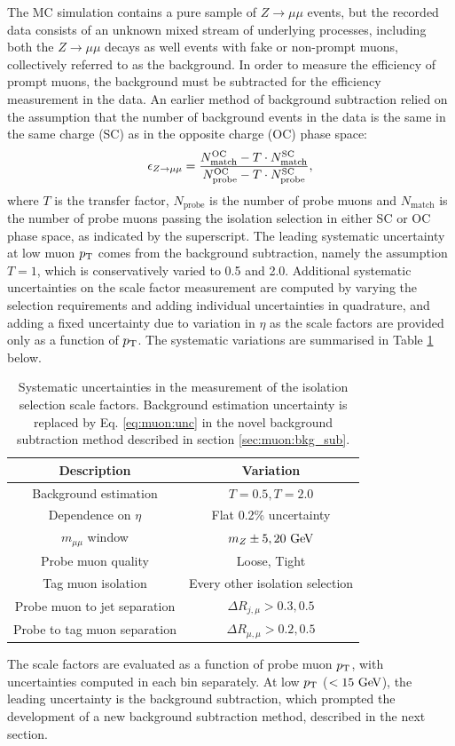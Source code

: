 The MC simulation contains a pure sample of $Z\rightarrow\mu\mu$ events,
but the recorded data consists of an unknown mixed stream of underlying
processes, including both the $Z\rightarrow\mu\mu$ decays as well events with fake
or non-prompt muons, collectively referred to as the background. In order
to measure the efficiency of prompt muons, the background must be
subtracted for the efficiency measurement in the data. An earlier method of
background subtraction relied on the assumption that the number of
background events in the data is the same in the same charge
(SC) as in the opposite charge (OC) phase space:
\begin{equation}
\epsilon_{Z \rightarrow \mu\mu} =
\frac{N_\text{match}^\text{OC} - T \cdot N_\text{match}^\text{SC}}
     {N_\text{probe}^\text{OC} - T \cdot N_\text{probe}^\text{SC}},
\end{equation}
where $T$ is the transfer factor, $N_\text{probe}$ is the number of
probe muons and $N_\text{match}$ is the number of probe muons passing
the isolation selection in either SC or OC phase space, as indicated by
the superscript. The leading systematic uncertainty at low muon $p_{\text{T}}$
comes from the background subtraction, namely the assumption $T=1$, which
is conservatively varied to 0.5 and 2.0.
Additional systematic uncertainties on the scale factor
measurement are computed by varying the selection requirements and
adding individual uncertainties in quadrature, and adding a fixed
uncertainty due to variation in $\eta$ as the scale factors are
provided only as a function of $p_{\text{T}}$. The systematic variations are
summarised in Table \ref{tab:muon:systs} below.
\begin{table}[h]
\centering
\caption{Systematic uncertainties in the measurement of the isolation
selection scale factors. Background estimation uncertainty is replaced
by Eq. \ref{eq:muon:unc} in the novel background subtraction method described
in section \ref{sec:muon:bkg_sub}.}
\label{tab:muon:systs}
\begin{tabular}{c c}
\toprule
\midrule
Description & Variation \\
\midrule
Background estimation         & $T=0.5, T=2.0$ \\
Dependence on $\eta$          & Flat 0.2\% uncertainty \\
$m_{\mu\mu}$ window           & $m_Z \pm 5, 20~\text{Ge\kern -0.1em V}$ \\ 
Probe muon quality            & Loose, Tight \\
Tag muon isolation            & Every other isolation selection \\ 
Probe muon to jet separation  & $\Delta R_{j, \mu} > 0.3, 0.5$ \\
Probe to tag muon separation  & $\Delta R_{\mu, \mu} > 0.2, 0.5$ \\
\midrule
\bottomrule
\end{tabular}
\end{table}
The scale factors are evaluated as a function of probe muon $p_{\text{T}}$,
with uncertainties computed in each bin separately. At low $p_{\text{T}}$
($< 15~\text{Ge\kern -0.1em V}$), the leading uncertainty is the background subtraction,
which prompted the development of a new background subtraction
method, described in the next section.

